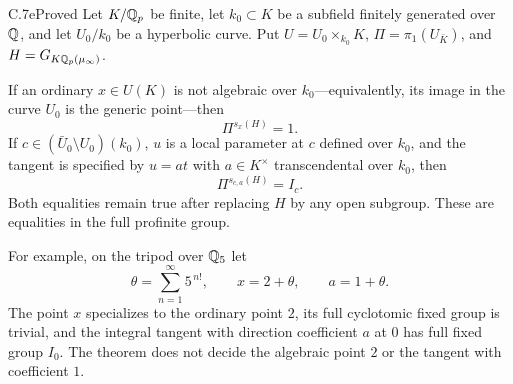 \begin{claim}{C.7e}{Proved}
Let $K/\mathbb Q_p$ be finite, let $k_0\subset K$ be a subfield finitely
generated over $\mathbb Q$, and let $U_0/k_0$ be a hyperbolic curve. Put
$U=U_0\times_{k_0}K$, $\Pi=\pi_1(U_{\bar K})$, and
$H=G_{K\mathbb Q_p(\mu_\infty)}$.

If an ordinary $x\in U(K)$ is not algebraic over $k_0$---equivalently,
its image in the curve $U_0$ is the generic point---then
\[
                         \Pi^{s_x(H)}=1.                     \tag{C.7e.1}
\]
If $c\in(\bar U_0\setminus U_0)(k_0)$, $u$ is a local parameter
at $c$ defined over $k_0$, and the tangent is specified by
$u=a t$ with $a\in K^\times$ transcendental over $k_0$, then
\[
                  \Pi^{s_{c,a}(H)}=I_c.                    \tag{C.7e.2}
\]
Both equalities remain true after replacing $H$ by any open subgroup.
These are equalities in the full profinite group.

For example, on the tripod over $\mathbb Q_5$ let
\[
 \theta=\sum_{n=1}^{\infty}5^{\,n!},\qquad x=2+\theta,
 \qquad a=1+\theta.
\]
The point $x$ specializes to the ordinary point $2$, its full
cyclotomic fixed group is trivial, and the integral tangent with
direction coefficient $a$ at $0$ has full fixed group $I_0$.
The theorem does not decide the algebraic point $2$ or the tangent
with coefficient $1$.
\end{claim}
